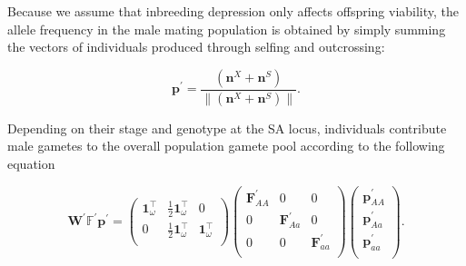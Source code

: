 \documentclass[11pt]{article}
\def\mbf#1{\mathbf{#1}}
\def\mbb#1{\mathbb{#1}}
\begin{document}
Because we assume that inbreeding depression only affects offspring viability, the allele frequency in the male mating population is obtained by simply summing the vectors of individuals produced through selfing and outcrossing:
\begin{linenomath*}
\begin{equation}
 	\mbf{p}^{\prime}=\frac{(\mbf{n}^X + \mbf{n}^S)}{\| (\mbf{n}^X + \mbf{n}^S)\|}.
 \end{equation}
\end{linenomath*}
Depending on their stage and genotype at the SA locus, individuals contribute male gametes to the overall population gamete pool according to the following equation
\begin{linenomath*}
\begin{equation}
		\mbf{W}^{\prime} \mbb{F}^{\prime} \mbf{p}^{\prime}= 
		\left(
			\begin{array}{ccc}
				\mbf{1}^{\intercal}_{\omega} & \frac{1}{2} \mbf{1}^{\intercal}_{\omega} & 0 \\
				0 & \frac{1}{2} \mbf{1}^{\intercal}_{\omega} & \mbf{1}^{\intercal}_{\omega} \\
			\end{array} \right)
		\left(
			\begin{array}{ccc}
				\mbf{F}^{\prime}_{AA} & 0 & 0 \\
				0 & \mbf{F}^{\prime}_{Aa} & 0 \\
				0 & 0 & \mbf{F}^{\prime}_{aa} \\
			\end{array} \right)
		\left(
			\begin{array}{c}
				\mbf{p}^{\prime}_{AA} \\
				\mbf{p}^{\prime}_{Aa} \\
				\mbf{p}^{\prime}_{aa} \\
			\end{array} \right).
\end{equation}
\end{linenomath*}
\end{document}
